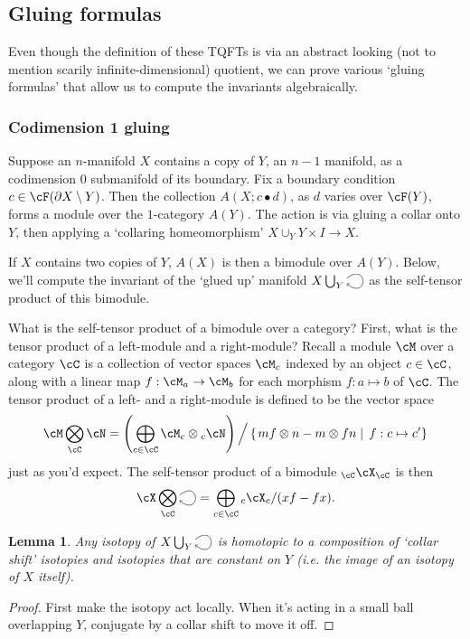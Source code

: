 \documentclass[11pt]{amsart}
\theoremstyle{plain}
\newtheorem{lem}[prop]{Lemma}
\newcommand{\selfarrow}{\ensuremath{\smash{\tikz[baseline]{\clip (0,0.36) rectangle (0.48,-0.16); \draw[->] (0,0.175) .. controls (0.6,0.65) and (0.6,-0.45) .. (0,0.025);}}}}
\newcommand{\bdy}{\partial}
\newcommand{\tensor}{\otimes}
\newcommand{\Tensor}{\bigotimes}
\newcommand{\DirectSum}{\bigoplus}
\newcommand{\setc}[2]{\setcl{#1}{#2}}
\newcommand{\setcl}[2]{\left\{ \left. #1 \;\right| \; #2 \right\}}
\begin{document}
\subsection{Gluing formulas}
Even though the definition of these TQFTs is via an abstract looking (not to mention scarily infinite-dimensional) quotient, we can prove various `gluing formulas' that allow us to compute the invariants algebraically.

\subsubsection{Codimension 1 gluing}

Suppose an $n$-manifold $X$ contains a copy of $Y$, an $n-1$ manifold, as a codimension $0$ submanifold of its boundary. Fix a boundary condition $c \in \cF(\bdy X \setminus Y)$. Then the collection $A(X; c \bullet d)$, as $d$ varies over $\cF(Y)$, forms a module over the $1$-category $A(Y)$. The action is via gluing a collar onto $Y$, then applying a `collaring homeomorphism' $X \cup_Y Y \times I \to X$.

If $X$ contains two copies of $Y$, $A(X)$ is then a bimodule over $A(Y)$. Below, we'll compute the invariant of the `glued up' manifold $X \bigcup_Y \selfarrow$ as the self-tensor product of this bimodule.

What is the self-tensor product of a bimodule over a category? First, what is the tensor product of a left-module and a right-module? Recall a module $\cM$ over a category $\cC$ is a collection of vector spaces $\cM_c$ indexed by an object $c \in \cC$, along with a linear map $f: \cM_a \to \cM_b$ for each morphism $f:a \mapsto b$ of $\cC$. The tensor product of a left- and a right-module is defined to be the vector space
$$\cM \Tensor_\cC \cN = \left(\DirectSum_{c \in \cC} \cM_c \tensor {}_c\cN\right) \Big/ \setc{mf \tensor n - m \tensor fn}{f: c \mapsto c'}$$
just as you'd expect. The self-tensor product of a bimodule ${}_{\cC}\cX_{\cC}$ is then
$$\cX \Tensor_{\cC} \selfarrow = \DirectSum_{c \in \cC} {}_c \cX_c / (xf - fx).$$ 


\begin{lem}
Any isotopy of $X \bigcup_Y \selfarrow$ is homotopic to a composition of `collar shift' isotopies and isotopies that are constant on $Y$ (i.e. the image of an isotopy of $X$ itself).
\end{lem}
\begin{proof}
First make the isotopy act locally. When it's acting in a small ball overlapping $Y$, conjugate by a collar shift to move it off.
\end{proof}
\end{document}
